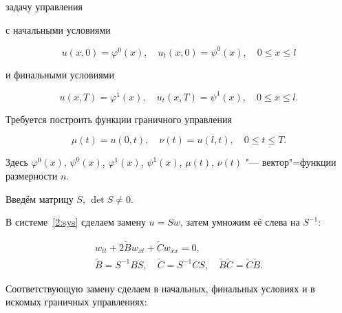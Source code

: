задачу управления

с начальными условиями

\begin{equation}

\label{2:final_sys}

u(x,0)=\varphi^0(x),\quad u_t(x,0)=\psi^0(x),\quad 0\leq{x}\leq{l}

\end{equation}

и финальными условиями

\begin{equation}

\label{2:final_sys}

u(x,T)=\varphi^1(x),\quad u_t(x,T)=\psi^1(x), \quad 0\leq{x}\leq{l}.

\end{equation}

Требуется построить функции граничного управления

\begin{equation}

\mu(t)=u(0,t),\quad \nu(t)=u(l,t), \quad  0\leq{t}\leq{T}.

\end{equation}

Здесь $\varphi^0(x)$, $\psi^0(x)$, $\varphi^1(x)$, $\psi^1(x)$, $\mu(t)$, $\nu(t)$ "--- вектор"=функции размерности $n$.





Введём матрицу $S$, $\det S\neq0$.

В системе~\eqref{2:sys} сделаем замену $u=Sw$, затем умножим её слева на $S^{-1}$:

\begin{gather}

\label{2:sys_d}

w_{tt}+2\widetilde{B}w_{xt}+\widetilde{C}w_{xx}=0,

\\

\label{2:SBC}

\widetilde{B}=S^{-1}BS,\quad \widetilde{C}=S^{-1}CS,\quad  \widetilde{B}\widetilde{C}=\widetilde{C}\widetilde{B}.

\end{gather}

Соответствующую замену сделаем в начальных, финальных условиях и в искомых граничных управлениях:

